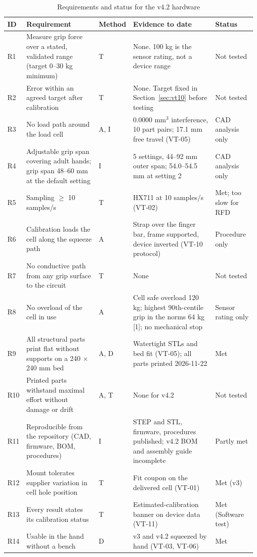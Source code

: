 \documentclass[10pt,a4paper]{article}
\newcommand{\cadan}{CAD analysis}
\newcommand{\swt}{Software test}
\newcommand{\nt}{\textcolor{warn}{Not tested}}
\begin{document}
\begin{table}[H]
\centering\small
\caption{Requirements and status for the v4.2 hardware}\label{tab:req}
\begin{tabularx}{\linewidth}{@{}p{0.7cm}P{4.2cm}p{0.9cm}LP{2.3cm}@{}}
\toprule
ID & Requirement & Method & Evidence to date & Status \\
\midrule
R1 & Measure grip force over a stated, validated range (target 0–30 kg minimum) & T & None. 100 kg is the sensor rating, not a device range & \nt \\
R2 & Error within an agreed target after calibration & T & None. Target fixed in Section~\ref{sec:vt10} before testing & \nt \\
R3 & No load path around the load cell & A, I & 0.0000 mm$^3$ interference, 10 part pairs; 17.1 mm free travel (VT-05) & \cadan{} only \\
R4 & Adjustable grip span covering adult hands; grip span 48–60 mm at the default setting & I & 5 settings, 44–92 mm outer span; 54.0–54.5 mm at setting 2 & \cadan{} only \\
R5 & Sampling $\geq$ 10 samples/s & T & HX711 at 10 samples/s (VT-02) & Met; too slow for RFD \\
R6 & Calibration loads the cell along the squeeze path & A & Strap over the finger bar, frame supported, device inverted (VT-10 protocol) & Procedure only \\
R7 & No conductive path from any grip surface to the circuit & T & None & \nt \\
R8 & No overload of the cell in use & A & Cell safe overload 120 kg; highest 90th-centile grip in the norms 64 kg [1]; no mechanical stop & Sensor rating only \\
R9 & All structural parts print flat without supports on a 240 × 240 mm bed & A, D & Watertight STLs and bed fit (VT-05); all parts printed 2026-11-22 & Met \\
R10 & Printed parts withstand maximal effort without damage or drift & A, T & None for v4.2 & \nt \\
R11 & Reproducible from the repository (CAD, firmware, BOM, procedures) & I & STEP and STL, firmware, procedures published; v4.2 BOM and assembly guide incomplete & Partly met \\
R12 & Mount tolerates supplier variation in cell hole position & T & Fit coupon on the delivered cell (VT-01) & Met (v3) \\
R13 & Every result states its calibration status & T & Estimated-calibration banner on device data (VT-11) & Met (\swt) \\
R14 & Usable in the hand without a bench & D & v3 and v4.2 squeezed by hand (VT-03, VT-06) & Met \\
\bottomrule
\end{tabularx}
\end{table}
\end{document}
